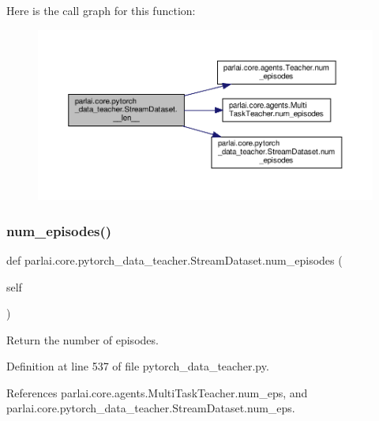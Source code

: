 Here is the call graph for this function\+:
\nopagebreak
\begin{figure}[H]
\begin{center}
\leavevmode
\includegraphics[width=350pt]{classparlai_1_1core_1_1pytorch__data__teacher_1_1StreamDataset_abbd35926c8f0dd0dd153d5f838be163c_cgraph}
\end{center}
\end{figure}
\mbox{\label{classparlai_1_1core_1_1pytorch__data__teacher_1_1StreamDataset_affcb2b9a39beb9c5504bb1051652d1e7}} 
\subsubsection{\texorpdfstring{num\+\_\+episodes()}{num\_episodes()}}
{\footnotesize\ttfamily def parlai.\+core.\+pytorch\+\_\+data\+\_\+teacher.\+Stream\+Dataset.\+num\+\_\+episodes (\begin{DoxyParamCaption}\item[{}]{self }\end{DoxyParamCaption})}

\begin{DoxyVerb}Return the number of episodes.\end{DoxyVerb}
 

Definition at line 537 of file pytorch\+\_\+data\+\_\+teacher.\+py.



References parlai.\+core.\+agents.\+Multi\+Task\+Teacher.\+num\+\_\+eps, and parlai.\+core.\+pytorch\+\_\+data\+\_\+teacher.\+Stream\+Dataset.\+num\+\_\+eps.



